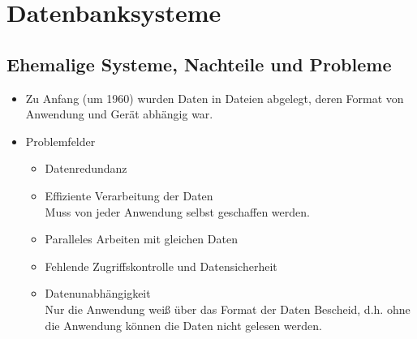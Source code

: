 \documentclass[a4paper, 11pt, accentcolor = tud3b]{tudreport}
\begin{document}
        \section{Datenbanksysteme} %
            \subsection{Ehemalige Systeme, Nachteile und Probleme} %
                \begin{itemize}
                	\item Zu Anfang (um 1960) wurden Daten in Dateien abgelegt, deren Format von Anwendung und Gerät abhängig war.
                	\item Problemfelder
	                	\begin{itemize}
	                		\item Datenredundanz
	                		\item Effiziente Verarbeitung der Daten \\ Muss von jeder Anwendung selbst geschaffen werden.
	                		\item Paralleles Arbeiten mit gleichen Daten
	                		\item Fehlende Zugriffskontrolle und Datensicherheit
	                		\item Datenunabhängigkeit \\ Nur die Anwendung weiß über das Format der Daten Bescheid, d.h. ohne die Anwendung können die Daten nicht gelesen werden.
	                	\end{itemize}
                \end{itemize}
\end{document}
